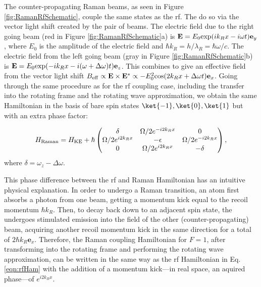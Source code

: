 	The counter-propagating Raman beams, as seen in Figure \ref{fig:RamanRfSchematic}, couple the same states as the rf. The do so via the vector light shift created by the pair of beams. The electric field due to the right going beam (red in Figure \ref{fig:RamanRfSchematic}a) is $\mathbf{E} = E_0 {\rm exp}(ik_R x - i\omega t) \mathbf{e}_y$, where $E_0$ is the amplitude of the electric field and $\hbar k_R = h/\lambda_R=\hbar\omega/c$. The electric field from the left going beam (gray in Figure \ref{fig:RamanRfSchematic}b) is $\mathbf{E} = E_0 {\rm exp}(-i k_R x - i(\omega +\Delta \omega)t) \mathbf{e}_z$. This combines to give an effective field from the vector light shift\cite{SteckTextbook} $B_{\rm eff}\propto \mathbf{E}\times\mathbf{E^*} \propto -E^2_0 {\rm cos}(2k_R x + \Delta\omega t)\mathbf{e}_x$. Going through the same procedure as for the rf coupling case, including the  transfer into the rotating frame and the rotating wave approximation, we obtain the same Hamiltonian in the basis of bare spin states $\ket{-1},\ket{0},\ket{1}$ but with an extra phase factor:
	 
\begin{equation}
H_{\rm Raman} = H_{\rm KE} + \hbar
 \begin{pmatrix} \delta & \Omega/2 e^{-i 2 k_R x}  &  0  \\ 
\Omega/2 e^{i 2 k_R x} & -\epsilon &  \Omega/2 e^{-i 2 k_R x}\\
 0 & \Omega/2 e^{i 2 k_R x} & -\delta  \\
 \end{pmatrix} \\,
\end{equation}
where $\delta = \omega_z - \Delta\omega$.

	This phase difference between the rf and Raman Hamiltonian has an intuitive physical explanation. In order to undergo a Raman transition, an atom first absorbs a photon from one beam, getting a momentum kick equal to the recoil momentum $\hbar k_R$. Then, to decay back down to an adjacent spin state, the undergoes stimulated emission into the field of the other (counter-propagating) beam, acquiring another recoil momentum kick in the same direction for a total of $2\hbar k_R \mathbf{e}_x$. Therefore, the Raman coupling Hamiltonian for $F=1$, after transforming into the rotating frame and performing the rotating wave approximation, can be written in the same way as the rf Hamiltonian in Eq. \ref{eqn:rfHam} with the addition of a momentum kick---in real space, an aquired phase---of $e^{i 2 k_R x}$.

